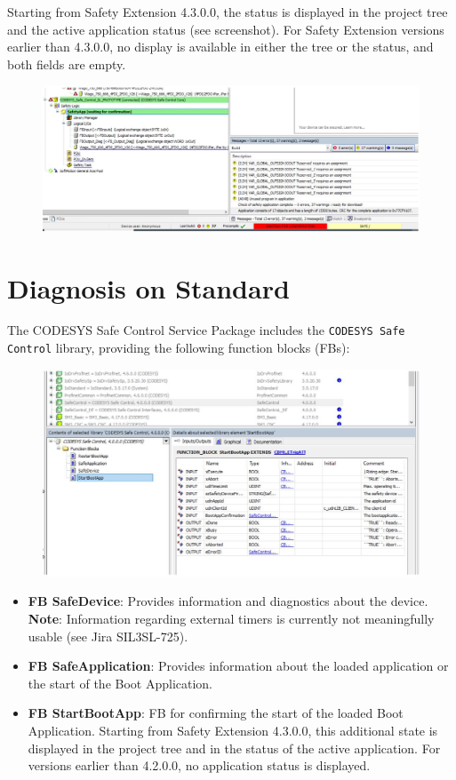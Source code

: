 \documentclass[a4paper,12pt]{article}
\begin{document}
Starting from Safety Extension 4.3.0.0, the status is displayed in the project tree and the active application status (see screenshot). For Safety Extension versions earlier than 4.3.0.0, no display is available in either the tree or the status, and both fields are empty.

\begin{figure}[H]
	\centering
	\includegraphics[width=1\textwidth]{25.JPG}
\end{figure}

\section{Diagnosis on Standard}
The CODESYS Safe Control Service Package includes the \texttt{CODESYS Safe Control} library, providing the following function blocks (FBs):

\begin{figure}[H]
	\centering
	\includegraphics[width=1\textwidth]{26.JPG}
\end{figure}

\begin{itemize}
	\item \textbf{FB SafeDevice}: Provides information and diagnostics about the device. \textbf{Note}: Information regarding external timers is currently not meaningfully usable (see Jira SIL3SL-725).
	\item \textbf{FB SafeApplication}: Provides information about the loaded application or the start of the Boot Application.
	\item \textbf{FB StartBootApp}: FB for confirming the start of the loaded Boot Application. Starting from Safety Extension 4.3.0.0, this additional state is displayed in the project tree and in the status of the active application. For versions earlier than 4.2.0.0, no application status is displayed.
\end{itemize}
\end{document}
